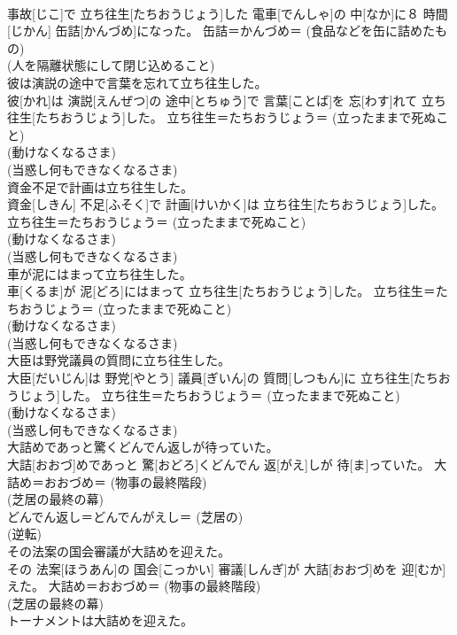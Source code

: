 \documentclass[8pt]{extreport}
\begin{document}
\begin{CJK}{UTF8}{min}
{\\	事故[じこ]で 立ち往生[たちおうじょう]した 電車[でんしゃ]の 中[なか]に８ 時間[じかん] 缶詰[かんづめ]になった。	缶詰＝かんづめ＝ (食品などを缶に詰めたもの) 
\\	(人を隔離状態にして閉じ込めること) 
\\	彼は演説の途中で言葉を忘れて立ち往生した。	
\\	彼[かれ]は 演説[えんぜつ]の 途中[とちゅう]で 言葉[ことば]を 忘[わす]れて 立ち往生[たちおうじょう]した。	立ち往生＝たちおうじょう＝ (立ったままで死ぬこと) 
\\	(動けなくなるさま) 
\\	(当惑し何もできなくなるさま) 
\\	資金不足で計画は立ち往生した。	
\\	資金[しきん] 不足[ふそく]で 計画[けいかく]は 立ち往生[たちおうじょう]した。	立ち往生＝たちおうじょう＝ (立ったままで死ぬこと) 
\\	(動けなくなるさま) 
\\	(当惑し何もできなくなるさま) 
\\	車が泥にはまって立ち往生した。	
\\	車[くるま]が 泥[どろ]にはまって 立ち往生[たちおうじょう]した。	立ち往生＝たちおうじょう＝ (立ったままで死ぬこと) 
\\	(動けなくなるさま) 
\\	(当惑し何もできなくなるさま) 
\\	大臣は野党議員の質問に立ち往生した。	
\\	大臣[だいじん]は 野党[やとう] 議員[ぎいん]の 質問[しつもん]に 立ち往生[たちおうじょう]した。	立ち往生＝たちおうじょう＝ (立ったままで死ぬこと) 
\\	(動けなくなるさま) 
\\	(当惑し何もできなくなるさま) 
\\	大詰めであっと驚くどんでん返しが待っていた。	
\\	大詰[おおづ]めであっと 驚[おどろ]くどんでん 返[がえ]しが 待[ま]っていた。	大詰め＝おおづめ＝ (物事の最終階段) 
\\	(芝居の最終の幕) 
\\	どんでん返し＝どんでんがえし＝ (芝居の) 
\\	(逆転) 
\\	その法案の国会審議が大詰めを迎えた。	
\\	その 法案[ほうあん]の 国会[こっかい] 審議[しんぎ]が 大詰[おおづ]めを 迎[むか]えた。	大詰め＝おおづめ＝ (物事の最終階段) 
\\	(芝居の最終の幕) 
\\	トーナメントは大詰めを迎えた。	
}
\end{CJK}
\end{document}
